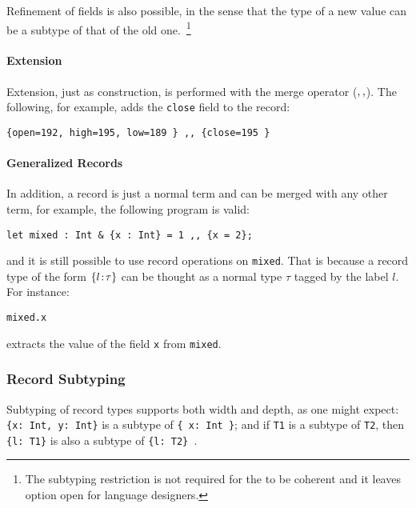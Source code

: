 Refinement of fields is also possible, in the sense
that the type of a new value can be a subtype of that of the old
one.~\footnote{The subtyping restriction is not required for the \name to be
  coherent and it leaves option open for language designers.}

\paragraph{Extension}
Extension, just as construction, is performed with the merge operator
($ ,, $). The following, for example, adds the \lstinline{close}
field to the record:
\begin{lstlisting}
{open=192, high=195, low=189 } ,, {close=195 }
\end{lstlisting}

\paragraph{Generalized Records}
In addition, a record is just a normal term and can be merged with any other
term, for example, the following program is valid:
\begin{lstlisting}
let mixed : Int & {x : Int} = 1 ,, {x = 2};
\end{lstlisting}
and it is still possible to use record operations on
\lstinline{mixed}. That is because a record type of the form $ \{ l \!:\! \tau \} $ can be thought as a normal type $ \tau $ tagged by the label
$ l $. For instance:
\begin{lstlisting}
mixed.x
\end{lstlisting}

\noindent extracts the value of the field \lstinline{x} from \lstinline{mixed}.

\subsubsection{Record Subtyping}

Subtyping of record types supports both width and depth, as one might
expect: \lstinline${x: Int, y: Int}$ is a subtype of
\lstinline${ x: Int }$; and if \lstinline$T1$ is a subtype of
\lstinline$T2$, then \lstinline${l: T1}$ is also a subtype of
\lstinline${l: T2} $.


